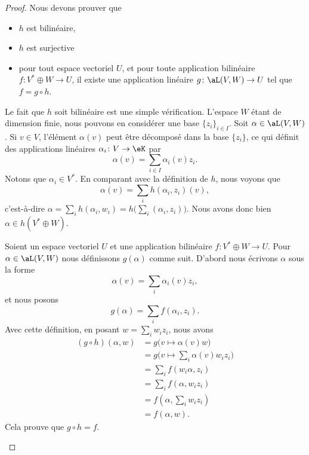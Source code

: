 \begin{proof}
	Nous devons prouver que
	\begin{itemize}
		\item \( h\) est bilinéaire,
		\item \( h\) est surjective
		\item pour tout espace vectoriel \( U\), et pour toute application bilinéaire \( f\colon V^*\oplus W\to U\), il existe une application linéaire \( g\colon \aL(V,W)\to U\) tel que \( f=g\circ h\).
	\end{itemize}

	\begin{subproof}
		\spitem[Bilinéaire]
		Le fait que \( h\) soit bilinéaire est une simple vérification.
		\spitem[Surjective]
		L'espace \( W\) étant de dimension finie, nous pouvons en considérer une base \( \{ z_i \}_{i\in I}\). Soit \( \alpha\in \aL(V,W)\). Si \( v\in V\), l'élément \( \alpha(v)\) peut être décomposé dans la base \( \{ z_i \}\), ce qui définit des applications linéaires \( \alpha_i\colon V\to \eK\) par
		\begin{equation}
			\alpha(v)=\sum_{i\in I}\alpha_i(v)z_i.
		\end{equation}
		Notons que \( \alpha_i\in V^*\). En comparant avec la définition de \( h\), nous voyons que
		\begin{equation}
			\alpha(v)=\sum_i h(\alpha_i,z_i)(v),
		\end{equation}
		c'est-à-dire \( \alpha=\sum_ih(\alpha_i,w_i)=h\big( \sum_i(\alpha_i,z_i) \big)\). Nous avons donc bien \( \alpha\in h(V^*\oplus W)\).

		Soient un espace vectoriel \( U\) et une application bilinéaire \( f\colon V^*\oplus W\to U\). Pour \( \alpha\in\aL(V,W)\) nous définissons \( g(\alpha)\) comme suit. D'abord nous écrivons \( \alpha\) sous la forme
		\begin{equation}
			\alpha(v)=\sum_i\alpha_i(v)z_i,
		\end{equation}
		et nous posons
		\begin{equation}
			g(\alpha)=\sum_if(\alpha_i,z_i).
		\end{equation}
		Avec cette définition, en posant \( w=\sum_iw_iz_i\), nous avons
		\begin{subequations}
			\begin{align}
				(g\circ h)(\alpha,w) & =g\big( v\mapsto \alpha(v)w \big)            \\
				                     & =g\big( v\mapsto \sum_i\alpha(v)w_iz_i \big) \\
				                     & =\sum_if(w_i\alpha,z_i)                      \\
				                     & =\sum_if(\alpha,w_iz_i)                      \\
				                     & =f(\alpha,\sum_iw_iz_i)                      \\
				                     & =f(\alpha,w).
			\end{align}
		\end{subequations}
		Cela prouve que \( g\circ h=f\).
	\end{subproof}
\end{proof}


